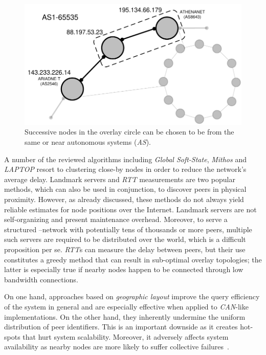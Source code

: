 \begin{figure}[ht]
\centering
  \includegraphics[scale=0.44]{img/pdf/geographic-layout.pdf}
\caption{Successive nodes in the overlay circle can be chosen to be from the
same or near autonomous systems (\emph{AS}).}
\label{figure:geographic-layout}
\end{figure}
A number of the reviewed algorithms including 
\emph{Global Soft-State},
\emph{Mithos} and \emph{LAPTOP} resort to clustering close-by nodes in
order to reduce the network's average delay.
Landmark servers and \emph{RTT} measurements are two popular methods, which
can also be used in conjunction, to discover peers in physical proximity.
However, as already discussed, these
methods do not always yield reliable estimates for node positions over the
Internet. 
Landmark servers are not self-organizing and present maintenance
overhead. Moreover, to serve a structured \p--network with potentially 
tens of thousands or more 
peers, multiple such servers are required to be distributed over the world, 
which is a difficult proposition per se.
\emph{RTT}s can measure the delay between peers, but their use constitutes a
greedy method that can result in sub-optimal overlay topologies;
the latter is especially true if nearby 
nodes happen to be connected through low bandwidth connections.

On one hand, approaches based on \emph{geographic layout} improve the query
efficiency of the system in general and are especially effective when applied
to \emph{CAN}-like implementations. On the other hand, they inherently undermine the
uniform distribution of peer identifiers. This is an important downside as it
creates hot-spots that hurt system scalability. 
Moreover, it adversely affects system availability as nearby nodes
are more likely to suffer collective failures~\cite{HY2007}.



